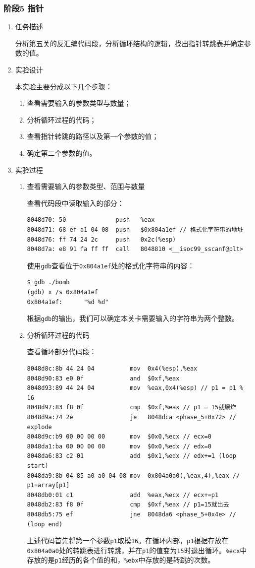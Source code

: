 \documentclass{paper}
\begin{document}
\subsubsection{阶段5 指针}
\begin{enumerate}
\item 任务描述

分析第五关的反汇编代码段，分析循环结构的逻辑，找出指针转跳表并确定参数的值。

\item 实验设计

本实验主要分成以下几个步骤：
\begin{enumerate}
\item 查看需要输入的参数类型与数量；
\item 分析循环过程的代码；
\item 查看指针转跳的路径以及第一个参数的值；
\item 确定第二个参数的值。
\end{enumerate}

\item 实验过程

\begin{enumerate}
\item 查看需要输入的参数类型、范围与数量

查看代码段中读取输入的部分：
\begin{lstlisting}
8048d70: 50              push   %eax
8048d71: 68 ef a1 04 08  push   $0x804a1ef // 格式化字符串的地址
8048d76: ff 74 24 2c     push   0x2c(%esp)
8048d7a: e8 91 fa ff ff  call   8048810 <__isoc99_sscanf@plt>
\end{lstlisting}
使用\verb|gdb|查看位于\verb|0x804a1ef|处的格式化字符串的内容：
\begin{lstlisting}
$ gdb ./bomb
(gdb) x /s 0x804a1ef
0x804a1ef:      "%d %d"
\end{lstlisting}
根据\verb|gdb|的输出，我们可以确定本关卡需要输入的字符串为两个整数。

\item 分析循环过程的代码\label{l3}

查看循环部分代码段：
\begin{lstlisting}
8048d8c:8b 44 24 04          mov  0x4(%esp),%eax
8048d90:83 e0 0f             and  $0xf,%eax
8048d93:89 44 24 04          mov  %eax,0x4(%esp) // p1 = p1 % 16
8048d97:83 f8 0f             cmp  $0xf,%eax // p1 = 15就爆炸
8048d9a:74 2e                je   8048dca <phase_5+0x72> // explode
8048d9c:b9 00 00 00 00       mov  $0x0,%ecx // ecx=0
8048da1:ba 00 00 00 00       mov  $0x0,%edx // edx=0
8048da6:83 c2 01             add  $0x1,%edx // edx+=1 (loop start)
8048da9:8b 04 85 a0 a0 04 08 mov  0x804a0a0(,%eax,4),%eax // p1=array[p1]
8048db0:01 c1                add  %eax,%ecx // ecx+=p1
8048db2:83 f8 0f             cmp  $0xf,%eax // p1=15就出去
8048db5:75 ef                jne  8048da6 <phase_5+0x4e> // (loop end)
\end{lstlisting}
上述代码首先将第一个参数\verb|p1|取模\verb|16|。在循环内部，\verb|p1|根据存放在\verb|0x804a0a0|处的转跳表进行转跳，并在\verb|p1|的值变为\verb|15|时退出循环。\verb|%ecx|中存放的是\verb|p1|经历的各个值的和，\verb|%ebx|中存放的是转跳的次数。


\end{enumerate}
\end{enumerate}
\end{document}
